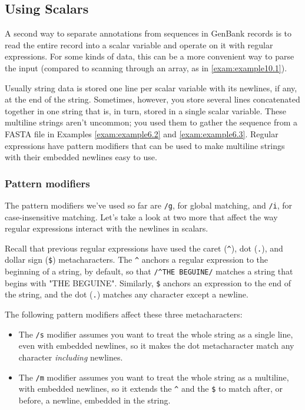 \subsection{Using Scalars}
A second way to separate annotations from sequences in GenBank records is to read the entire record into a scalar variable and operate on it with regular expressions. For some kinds of data, this can be a more convenient way to parse the input (compared to scanning through an array, as in \autoref{exam:example10.1}).

Usually string data is stored one line per scalar variable with its newlines, if any, at the end of the string. Sometimes, however, you store several lines concatenated together in one string that is, in turn, stored in a single scalar variable. These multiline strings aren't uncommon; you used them to gather the sequence from a FASTA file in Examples \autoref{exam:example6.2} and \autoref{exam:example6.3}. Regular expressions have pattern modifiers that can be used to make multiline strings with their embedded newlines easy to use. 

\subsubsection{Pattern modifiers}
The pattern modifiers we've used so far are \verb|/g|, for global matching, and \verb|/i|, for case-insensitive matching. Let's take a look at two more that affect the way regular expressions interact with the newlines in scalars.

Recall that previous regular expressions have used the caret (\verb|^|), dot (\verb|.|), and dollar sign (\verb|$|) metacharacters. The \verb|^| anchors a regular expression to the beginning of a string, by default, so that \verb|/^THE BEGUINE/| matches a string that begins with "THE BEGUINE". Similarly, \verb|$| anchors an expression to the end of the string, and the dot (\verb|.|) matches any character except a newline.

The following pattern modifiers affect these three metacharacters:

\begin{itemize}
  \item The \verb|/s| modifier assumes you want to treat the whole string as a single line, even with embedded newlines, so it makes the dot metacharacter match any character \textit{including} newlines.  
  \item The \verb|/m| modifier assumes you want to treat the whole string as a multiline, with embedded newlines, so it extends the \verb|^| and the \verb|$| to match after, or before, a newline, embedded in the string.
\end{itemize}

